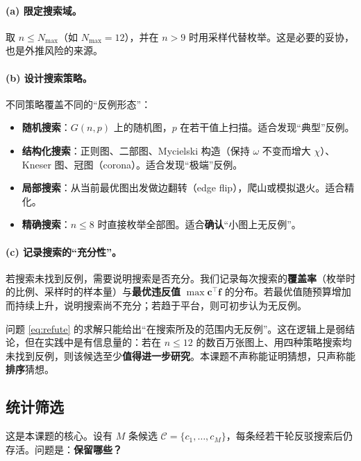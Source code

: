 \paragraph{(a) 限定搜索域。}取 $n\le N_{\max}$（如 $N_{\max}=12$），并在 $n>9$ 时用采样代替枚举。这是必要的妥协，也是外推风险的来源。

\paragraph{(b) 设计搜索策略。}不同策略覆盖不同的“反例形态”：
\begin{itemize}
  \item \textbf{随机搜索}：$G(n,p)$ 上的随机图，$p$ 在若干值上扫描。适合发现“典型”反例。
  \item \textbf{结构化搜索}：正则图、二部图、Mycielski 构造（保持 $\omega$ 不变而增大 $\chi$）、Kneser 图、冠图（corona）。适合发现“极端”反例。
  \item \textbf{局部搜索}：从当前最优图出发做边翻转（edge flip），爬山或模拟退火。适合精化。
  \item \textbf{精确搜索}：$n\le 8$ 时直接枚举全部图。适合\textbf{确认}“小图上无反例”。
\end{itemize}

\paragraph{(c) 记录搜索的“充分性”。}若搜索未找到反例，需要说明搜索是否充分。我们记录每次搜索的\textbf{覆盖率}（枚举时的比例、采样时的样本量）与\textbf{最优违反值} $\max \bm{c}^\top\bm{f}$ 的分布。若最优值随预算增加而持续上升，说明搜索尚不充分；若趋于平台，则可初步认为无反例。

\begin{remark}[“无反例”不是“成立”]
\label{rem:no-counter}
问题 \eqref{eq:refute} 的求解只能给出“在搜索所及的范围内无反例”。这在逻辑上是弱结论，但在实践中是有信息量的：若在 $n\le 12$ 的数百万张图上、用四种策略搜索均未找到反例，则该候选至少\textbf{值得进一步研究}。本课题不声称能证明猜想，只声称能\textbf{排序}猜想。
\end{remark}

\subsection{统计筛选}
\label{sec:f-screen}

这是本课题的核心。设有 $M$ 条候选 $\mathcal{C}=\{c_1,\dots,c_M\}$，每条经若干轮反驳搜索后仍存活。问题是：\textbf{保留哪些？}

